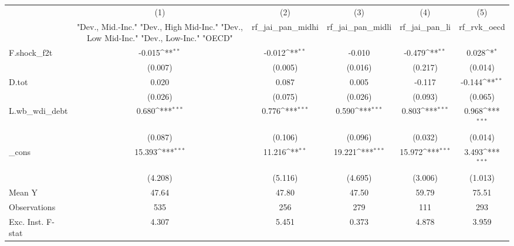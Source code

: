 {
\def\sym#1{\ifmmode^{#1}\else\(^{#1}\)\fi}
\begin{tabular}{l*{5}{c}}
\toprule
            &\multicolumn{1}{c}{(1)}&\multicolumn{1}{c}{(2)}&\multicolumn{1}{c}{(3)}&\multicolumn{1}{c}{(4)}&\multicolumn{1}{c}{(5)}\\
            &\multicolumn{1}{c}{ "Dev., Mid.-Inc." "Dev., High Mid-Inc." "Dev., Low Mid-Inc." "Dev., Low-Inc." "OECD" }&\multicolumn{1}{c}{rf\_jai\_pan\_midhi}&\multicolumn{1}{c}{rf\_jai\_pan\_midli}&\multicolumn{1}{c}{rf\_jai\_pan\_li}&\multicolumn{1}{c}{rf\_rvk\_oecd}\\
\midrule
F.shock\_f2t &      -0.015\sym{**} &      -0.012\sym{**} &      -0.010         &      -0.479\sym{**} &       0.028\sym{*}  \\
            &     (0.007)         &     (0.005)         &     (0.016)         &     (0.217)         &     (0.014)         \\
\addlinespace
D.tot       &       0.020         &       0.087         &       0.005         &      -0.117         &      -0.144\sym{**} \\
            &     (0.026)         &     (0.075)         &     (0.026)         &     (0.093)         &     (0.065)         \\
\addlinespace
L.wb\_wdi\_debt&       0.680\sym{***}&       0.776\sym{***}&       0.590\sym{***}&       0.803\sym{***}&       0.968\sym{***}\\
            &     (0.087)         &     (0.106)         &     (0.096)         &     (0.032)         &     (0.014)         \\
\addlinespace
\_cons      &      15.393\sym{***}&      11.216\sym{**} &      19.221\sym{***}&      15.972\sym{***}&       3.493\sym{***}\\
            &     (4.208)         &     (5.116)         &     (4.695)         &     (3.006)         &     (1.013)         \\
\midrule
Mean Y      &       47.64         &       47.80         &       47.50         &       59.79         &       75.51         \\
Observations&         535         &         256         &         279         &         111         &         293         \\
Exc. Inst. F-stat&       4.307         &       5.451         &       0.373         &       4.878         &       3.959         \\
\bottomrule
\end{tabular}
}
